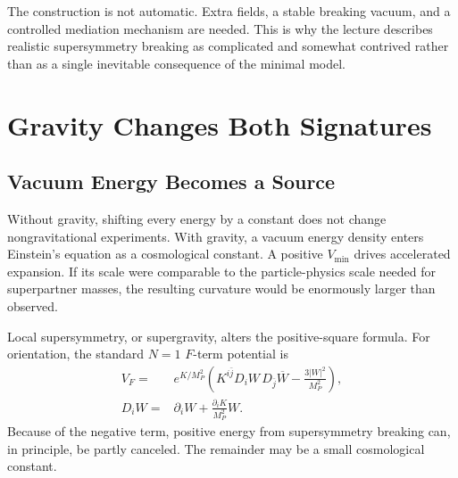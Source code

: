 The construction is not automatic. Extra fields, a stable breaking vacuum, and a controlled mediation mechanism are needed. This is why the lecture describes realistic supersymmetry breaking as complicated and somewhat contrived rather than as a single inevitable consequence of the minimal model.

\section{Gravity Changes Both Signatures}

\subsection{Vacuum Energy Becomes a Source}

Without gravity, shifting every energy by a constant does not change nongravitational experiments. With gravity, a vacuum energy density enters Einstein's equation as a cosmological constant. A positive \(V_{\min}\) drives accelerated expansion. If its scale were comparable to the particle-physics scale needed for superpartner masses, the resulting curvature would be enormously larger than observed.

\begin{classroomqa}
\end{classroomqa}

Local supersymmetry, or supergravity, alters the positive-square formula. For orientation, the standard \(N=1\) \(F\)-term potential is
\begin{equation}
\begin{aligned}
V_F={}&e^{K/M_P^2}
\left(
K^{i\bar j}D_iW\,D_{\bar j}\overline W
-\frac{3|W|^2}{M_P^2}
\right),\\
D_iW={}&\partial_iW+\frac{\partial_iK}{M_P^2}W.
\end{aligned}
\label{eq:l9-sugra-potential}
\end{equation}
Because of the negative term, positive energy from supersymmetry breaking can,
in principle, be partly canceled. The remainder may be a small cosmological
constant.



